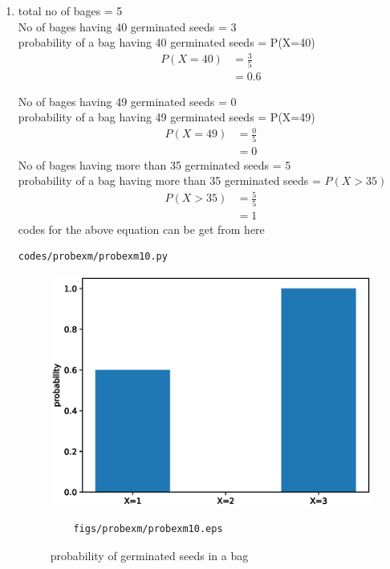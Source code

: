 \renewcommand{\theequation}{\theenumi}
\begin{enumerate}[label=\arabic*.,ref=\thesubsection.\theenumi]
\item total no of bages = 5\\
No of bages having 40 germinated seeds = 3\\

probability of a bag having 40 germinated seeds  = P(X=40)
\\
\begin{align}
P\left(X=40\right) &= \frac{3}{5}
\\
&= 0.6
\end{align}

No of bages having 49 germinated seeds = 0\\

probability of a bag having 49 germinated seeds  = P(X=49)
\\
\begin{align}
P\left(X=49\right) &= \frac{0}{5}
\\
&= 0
\end{align}
No of bages having more than 35 germinated seeds = 5\\

probability of a bag having more than 35 germinated seeds  = $P(X>35)$
\
\begin{align}
P\left(X>35\right) &= \frac{5}{5}
\\
&= 1
\end{align}
codes for the above equation can be get from here
\begin{lstlisting}
codes/probexm/probexm10.py
\end{lstlisting}
\begin{figure}[!ht]
	\centering
	\includegraphics[width=\columnwidth]{./figures/probexm/probexm10.eps}
	\caption{probability of germinated seeds in a bag }
	\label{fig:bt10}
	\begin{lstlisting}
	figs/probexm/probexm10.eps
	\end{lstlisting}
\end{figure}
\end{enumerate}